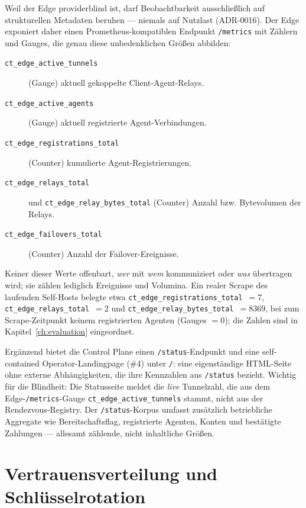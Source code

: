 Weil der Edge providerblind ist, darf Beobachtbarkeit ausschließlich auf
strukturellen Metadaten beruhen --- niemals auf Nutzlast (ADR-0016). Der Edge
exponiert daher einen Prometheus-kompatiblen Endpunkt \texttt{/metrics} mit
Zählern und Gauges, die genau diese unbedenklichen Größen abbilden:

\begin{description}
  \item[\texttt{ct\_edge\_active\_tunnels}] (Gauge) aktuell gekoppelte
    Client-Agent-Relays.
  \item[\texttt{ct\_edge\_active\_agents}] (Gauge) aktuell registrierte
    Agent-Verbindungen.
  \item[\texttt{ct\_edge\_registrations\_total}] (Counter) kumulierte
    Agent-Registrierungen.
  \item[\texttt{ct\_edge\_relays\_total}] und
    \texttt{ct\_edge\_relay\_bytes\_total} (Counter) Anzahl bzw. Bytevolumen der
    Relays.
  \item[\texttt{ct\_edge\_failovers\_total}] (Counter) Anzahl der Failover-Ereignisse.
\end{description}

Keiner dieser Werte offenbart, \emph{wer} mit \emph{wem} kommuniziert oder
\emph{was} übertragen wird; sie zählen lediglich Ereignisse und Volumina. Ein
realer Scrape des laufenden Self-Hosts belegte etwa
\texttt{ct\_edge\_registrations\_total}~$=7$,
\texttt{ct\_edge\_relays\_total}~$=2$ und
\texttt{ct\_edge\_relay\_bytes\_total}~$=8369$, bei zum Scrape-Zeitpunkt keinem
registrierten Agenten (Gauges $=0$); die Zahlen sind in
Kapitel~\ref{ch:evaluation} eingeordnet.

Ergänzend bietet die Control Plane einen \texttt{/status}-Endpunkt und eine
self-contained Operator-Landingpage (\#4) unter \texttt{/}: eine eigenständige
HTML-Seite ohne externe Abhängigkeiten, die ihre Kennzahlen aus
\texttt{/status} bezieht. Wichtig für die Blindheit: Die Statusseite meldet die
\emph{live} Tunnelzahl, die aus dem Edge-\texttt{/metrics}-Gauge
\texttt{ct\_edge\_active\_tunnels} stammt, nicht aus der Rendezvous-Registry.
Der \texttt{/status}-Korpus umfasst zusätzlich betriebliche Aggregate wie
Bereitschaftsflag, registrierte Agenten, Konten und bestätigte Zahlungen ---
allesamt zählende, nicht inhaltliche Größen.

\section{Vertrauensverteilung und Schlüsselrotation}
\label{sec:trust}

